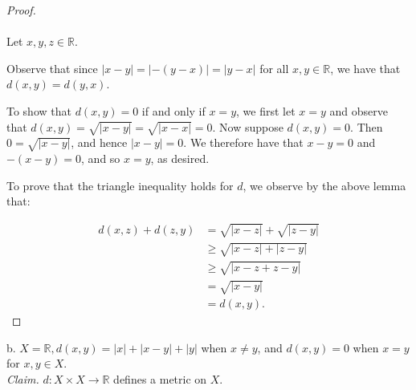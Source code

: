     \begin{proof}\ \\\\
        Let $x, y, z \in \mathbb{R}$.
       
        Observe that since $|x - y| =  |-(y - x)| = |y - x|$ for all $x, y \in \mathbb{R}$, we have that $d(x, y) = d(y, x)$.

        To show that $d(x, y) = 0$ if and only if $x = y$, we first let $x = y$ and observe that $d(x, y) = \sqrt{|x - y|} = \sqrt{|x - x|} = 0$.
        Now suppose $d(x, y) = 0$. Then $0 = \sqrt{|x - y|}$, and hence $|x - y| = 0$. We therefore have that $x - y = 0$ and $-(x - y) = 0$, and so
        $x = y$, as desired. 

        To prove that the triangle inequality holds for $d$, we observe by the above lemma that:
        
        \begin{align*}
            d(x, z) + d(z, y) &= \sqrt{|x - z|} + \sqrt{|z - y|} \\
                              &\ge \sqrt{|x - z| + |z - y|} \\
                              &\ge \sqrt{|x - z + z - y|} \\
                              &= \sqrt{|x - y|} \\
                              &= d(x, y).
        \end{align*}
    \end{proof}

    \pagebreak

b.  $X = \mathbb{R}, d(x, y) = |x| + |x - y| + |y|$ when $x \neq y$, and 
    $d(x, y) = 0$ when $x = y$ for $x, y \in X$. \ \\

    \emph{Claim.} $d: X \times X \to \mathbb{R}$ defines a metric on $X$.
    \ \\

